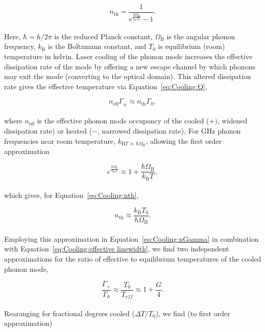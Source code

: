 \begin{equation}
  n_{\mathrm{th}} = \frac{1}{e^\frac{\hbar\Omega_{\mathrm{B}}}{k_{\mathrm{B}}T_{0}} - 1}.
  \label{eq:Cooling:nth}
\end{equation}
\\
Here, \(\hbar = h/2\pi\) is the reduced Planck constant, \(\Omega_{\mathrm{B}}\) is the angular phonon frequency, \(k_{\mathrm{B}}\) is the Boltzmann constant, and \(T_{0}\) is equilibrium (room) temperature in kelvin. Laser cooling of the phonon mode increases the effective dissipation rate of the mode by offering a new escape channel by which phonons may exit the mode (converting to the optical domain). This altered dissipation rate gives the effective temperature via Equation~\ref{eq:Cooling:Q},

\begin{equation}
  n_{\mathrm{eff}}\Gamma_{\mathrm{\pm}} \approx n_{\mathrm{th}}\Gamma_{0},
  \label{eq:Cooling:nGamma}
\end{equation}
\\
where \(n_{\mathrm{eff}}\) is the effective phonon mode occupancy of the cooled (\(+)\), widened dissipation rate) or heated (\(-\), narrowed dissipation rate). For \si{\giga\hertz} phonon frequencies near room temperature, \(k_{\mathrm{B}T \gg \hbar\Omega_{\mathrm{B}}}\), allowing the first order approximation

\begin{equation}
  e^{\frac{\hbar\Omega_{\mathrm{B}}}{k_{\mathrm{B}}T}} \approx 1 + \frac{\hbar\Omega_{\mathrm{B}}}{k_{\mathrm{B}}T},
\end{equation}
\\
which gives, for Equation~\ref{eq:Cooling:nth},

\begin{equation}
  n_{\mathrm{th}} \approx \frac{k_{\mathrm{B}}T_{0}}{\hbar\Omega_{\mathrm{B}}}.
\end{equation}
\\
Employing this approximation in Equation~\ref{eq:Cooling:nGamma} in combination with Equation~\ref{eq:Cooling:effective linewidth}, we find two independent approximations for the ratio of effective to equilibrium temperatures of the cooled phonon mode,

\begin{equation}
  \frac{\Gamma_{+}}{\Gamma_{0}} \approx \frac{T_{0}}{T_{eff}} \approx 1 + \frac{G}{4}.
\end{equation}
\\
Rearanging for fractional degrees cooled (\(\Delta T/T_{0}\)), we find (to first order approximation)

